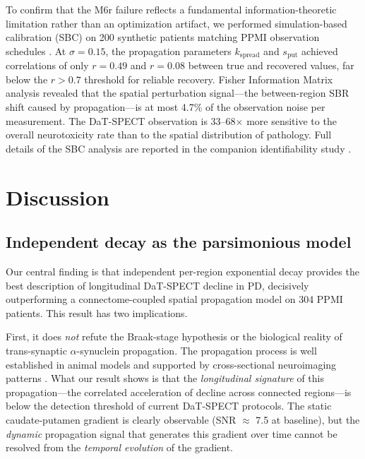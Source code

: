 To confirm that the M6r failure reflects a fundamental information-theoretic limitation rather than an optimization artifact, we performed simulation-based calibration (SBC) on 200 synthetic patients matching PPMI observation schedules \cite{talts2018}. At $\sigma = 0.15$, the propagation parameters $k_{\text{spread}}$ and $s_{\text{put}}$ achieved correlations of only $r = 0.49$ and $r = 0.08$ between true and recovered values, far below the $r > 0.7$ threshold for reliable recovery. Fisher Information Matrix analysis revealed that the spatial perturbation signal---the between-region SBR shift caused by propagation---is at most 4.7\% of the observation noise per measurement. The DaT-SPECT observation is 33--68$\times$ more sensitive to the overall neurotoxicity rate than to the spatial distribution of pathology. Full details of the SBC analysis are reported in the companion identifiability study \cite{dupre2026paper8a}.

\section{Discussion}

\subsection{Independent decay as the parsimonious model}

Our central finding is that independent per-region exponential decay provides the best description of longitudinal DaT-SPECT decline in PD, decisively outperforming a connectome-coupled spatial propagation model on 304 PPMI patients. This result has two implications.

First, it does \textit{not} refute the Braak-stage hypothesis or the biological reality of trans-synaptic $\alpha$-synuclein propagation. The propagation process is well established in animal models \cite{chu2019, patterson2019} and supported by cross-sectional neuroimaging patterns \cite{pandya2019, abdelgawad2022}. What our result shows is that the \textit{longitudinal signature} of this propagation---the correlated acceleration of decline across connected regions---is below the detection threshold of current DaT-SPECT protocols. The static caudate-putamen gradient is clearly observable (SNR $\approx$ 7.5 at baseline), but the \textit{dynamic} propagation signal that generates this gradient over time cannot be resolved from the \textit{temporal evolution} of the gradient.

